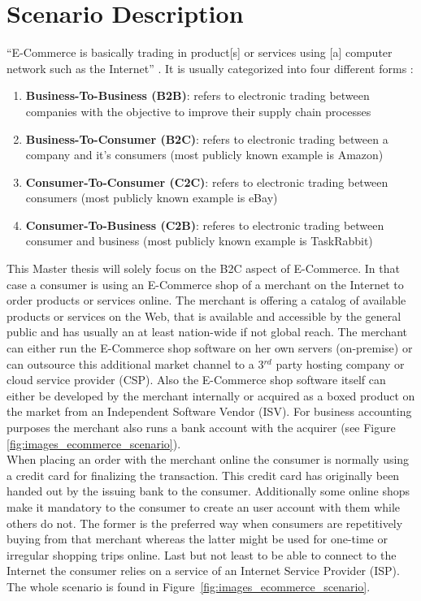 
\section{Scenario Description}
\label{sec:scenario_description}

``E-Commerce is basically trading in product[s] or services using [a] computer network such as the Internet'' \citep{sen2015study}.
It is usually categorized into four different forms \citep{sen2015study}:\@

\begin{enumerate}
  \item \textbf{Business-To-Business (B2B)}: refers to electronic trading between companies with the objective to improve their supply chain processes
  \item \textbf{Business-To-Consumer (B2C)}: refers to electronic trading between a company and it's consumers (most publicly known example is Amazon)
  \item \textbf{Consumer-To-Consumer (C2C)}: refers to electronic trading between consumers (most publicly known example is eBay)
  \item \textbf{Consumer-To-Business (C2B)}: referes to electronic trading between consumer and business (most publicly known example is TaskRabbit)
\end{enumerate}

This Master thesis will solely focus on the B2C aspect of E-Commerce. In that case a consumer is using an E-Commerce shop of a merchant on the Internet to order products or services online. The merchant is offering a catalog of available products or services on the Web, that is available and accessible by the general public and has usually an at least nation-wide if not global reach. The merchant can either run the E-Commerce shop software on her own servers (on-premise) or can outsource this additional market channel to a 3$^{rd}$ party hosting company or cloud service provider (CSP). Also the E-Commerce shop software itself can either be developed by the merchant internally or acquired as a boxed product on the market from an Independent Software Vendor (ISV). For business accounting purposes the merchant also runs a bank account with the acquirer (see Figure \ref{fig:images_ecommerce_scenario}). \\
When placing an order with the merchant online the consumer is normally using a credit card for finalizing the transaction. This credit card has originally been handed out by the issuing bank to the consumer. Additionally some online shops make it mandatory to the consumer to create an user account with them while others do not. The former is the preferred way when consumers are repetitively buying from that merchant whereas the latter might be used for one-time or irregular shopping trips online. Last but not least to be able to connect to the Internet the consumer relies on a service of an Internet Service Provider (ISP). The whole scenario is found in Figure~\ref{fig:images_ecommerce_scenario}.\@

